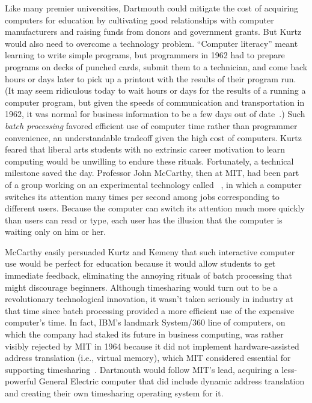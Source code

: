 Like many premier universities, Dartmouth could mitigate the cost of
acquiring computers for education by cultivating good relationships with
computer manufacturers and raising funds from donors and government
grants.
But Kurtz would also need to overcome a technology problem.
``Computer literacy'' meant learning to write simple programs,
but programmers in 1962 had to prepare programs on decks of punched cards,
submit them to a technician,
and come back hours or days later to pick up a printout with
the results of their program run.
(It may seem ridiculous today to wait hours or days for the results of a
running a computer program, but given the speeds of 
communication and transportation in 1962, it was normal for
business information to be a few days out of
date~\cite{ceruzzi}.) 
Such \emph{batch processing} favored efficient use of computer time rather
than programmer convenience, an understandable
tradeoff given the high cost of computers.
Kurtz feared that liberal arts students with no
extrinsic career motivation to learn computing would be unwilling
to endure these rituals.
Fortunately, a technical milestone saved the day.
Professor John McCarthy, then at MIT, had been part of a group working
on an experimental technology called
~\cite{corbato62timesharing}, in which a computer
switches its attention many times per second among jobs corresponding to
different users.
Because the computer can switch its attention much more quickly than
users can read or type, each user has the illusion that the computer
is waiting only on him or her.

McCarthy easily persuaded Kurtz and Kemeny that such interactive
computer use would be perfect for education because it would allow
students to get
immediate feedback, eliminating the annoying rituals of batch
processing that might discourage beginners.
Although timesharing would turn out to be a revolutionary
technological innovation, 
it wasn't taken seriously in industry at that time since batch
processing provided a more efficient use of the expensive computer's
time.  
In fact, IBM's landmark System/360 line of computers, on which the
company had staked its future in business computing, was rather visibly
rejected by MIT in 1964 because it did not implement hardware-assisted 
address translation (i.e., virtual memory), which MIT considered
essential for supporting timesharing~\cite{ibm360history}.
Dartmouth would
follow MIT's lead, acquiring a less-powerful General Electric computer that
did include dynamic address translation and creating their own timesharing
operating system for it.

